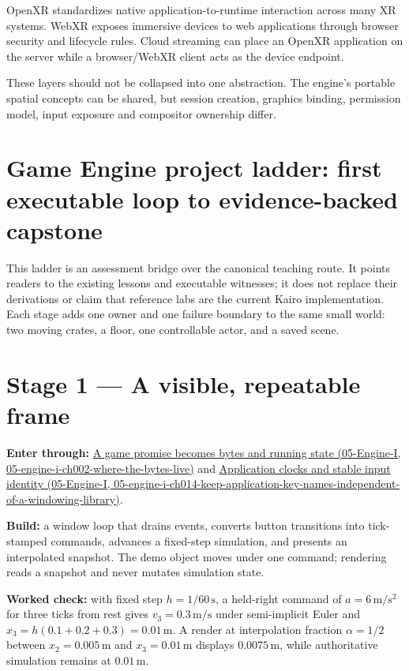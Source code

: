 OpenXR standardizes native application-to-runtime interaction across many XR systems. WebXR exposes immersive devices to web applications through browser security and lifecycle rules. Cloud streaming can place an OpenXR application on the server while a browser/WebXR client acts as the device endpoint.

These layers should not be collapsed into one abstraction. The engine's portable spatial concepts can be shared, but session creation, graphics binding, permission model, input exposure and compositor ownership differ.

\section{Game Engine project ladder: first executable loop to evidence-backed capstone}\label{06-engine-ii-ch042-game-engine-project-ladder-first-executable-loop-to-evidence-backed-capstone}

This ladder is an assessment bridge over the canonical teaching route. It points readers to the existing lessons and executable witnesses; it does not replace their derivations or claim that reference labs are the current Kairo implementation. Each stage adds one owner and one failure boundary to the same small world: two moving crates, a floor, one controllable actor, and a saved scene.

\section{Stage 1 --- A visible, repeatable frame}\label{06-engine-ii-ch042-stage-1-a-visible-repeatable-frame}

\textbf{Enter through:} \href{../05-Engine-I/main.pdf\#nameddest=05-engine-i-ch002-where-the-bytes-live}{A game promise becomes bytes and running state (05-Engine-I, 05-engine-i-ch002-where-the-bytes-live)} and \href{../05-Engine-I/main.pdf\#nameddest=05-engine-i-ch014-keep-application-key-names-independent-of-a-windowing-library}{Application clocks and stable input identity (05-Engine-I, 05-engine-i-ch014-keep-application-key-names-independent-of-a-windowing-library)}.

\textbf{Build:} a window loop that drains events, converts button transitions into tick-stamped commands, advances a fixed-step simulation, and presents an interpolated snapshot. The demo object moves under one command; rendering reads a snapshot and never mutates simulation state.

\textbf{Worked check:} with fixed step \(h=1/60\,\mathrm s\), a held-right command of \(a=6\,\mathrm{m/s^2}\) for three ticks from rest gives \(v_3=0.3\,\mathrm{m/s}\) under semi-implicit Euler and \(x_3=h(0.1+0.2+0.3)=0.01\,\mathrm m\). A render at interpolation fraction \(\alpha=1/2\) between \(x_2=0.005\,\mathrm m\) and \(x_3=0.01\,\mathrm m\) displays \(0.0075\,\mathrm m\), while authoritative simulation remains at \(0.01\,\mathrm m\).

